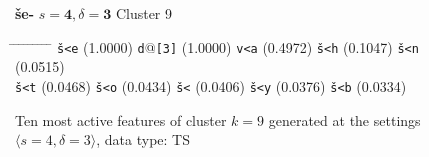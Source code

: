\begin{figure}[t] 
\begin{mdframed}
{\LARGE \textbf{\v{s}e-}} \hfill \large{$s=\textbf{4}, \delta=\textbf{3}$} \hfill Cluster 9\\
\vspace{-6pt}
\begin{normalsize}
\begin{tabbing}
\hspace{6ex} \= \hspace{12ex} \= \hspace{6ex} \= \hspace{12ex} \= \hspace{6ex} \= \hspace{12ex} \= \hspace{6ex} \= \hspace{12ex} \= \hspace{6ex} \= \hspace{9ex} \kill
\texttt{\v{s}<e} \> (1.0000) \> \texttt{d}@\texttt{[3]} \> (1.0000) \> \texttt{v<a} \> (0.4972) \> \texttt{\v{s}<h} \> (0.1047) \> \texttt{\v{s}<n} \> (0.0515) \\ 
\texttt{\v{s}<t} \> (0.0468) \> \texttt{\v{s}<o} \> (0.0434) \> \texttt{\v{s}<} \> (0.0406) \> \texttt{\v{s}<y} \> (0.0376) \> \texttt{\v{s}<b} \> (0.0334)
\end{tabbing}
\end{normalsize}
\label{fig:cluster-9-4-3-TS}
\caption{Ten most active features of cluster $k = 9$ generated at the settings $\langle{s}=4,\delta=3\rangle$, data type: TS}
\end{mdframed}
\end{figure}

